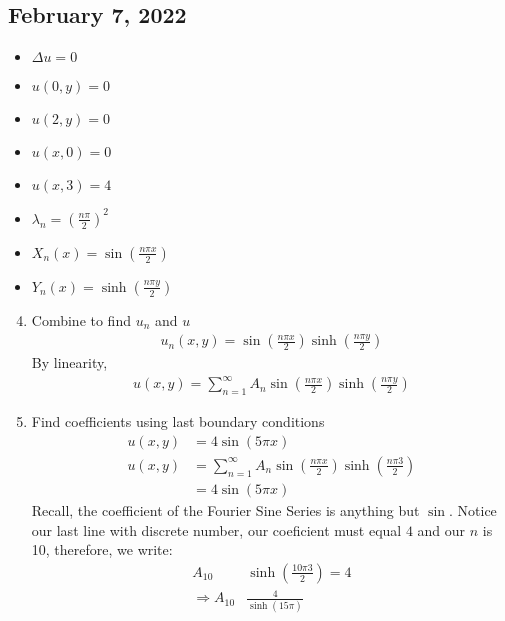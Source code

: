 \subsection*{February 7, 2022}
\begin{itemize}
  \item $\Delta u = 0$
  \item $u(0, y) = 0$
  \item $u(2, y) = 0$
  \item $u(x, 0) = 0$
  \item $u(x, 3) = 4$
  \item $\lambda_n = \left(\frac{n \pi}{2}\right)^2$
  \item $X_n(x) = \sin\left(\frac{n \pi x}{2}\right)$
  \item $Y_n(x) = \sinh\left(\frac{n \pi y}{2}\right)$
\end{itemize}
\begin{enumerate}
  \setcounter{enumi}{3}
  \item Combine to find $u_n$ and $u$
  \begin{align}
    u_n(x, y) = \sin\left( \frac{n \pi x}{2} \right)\sinh\left(\frac{n\pi y}{2} \right)
  \end{align}
  By linearity,
  \begin{align}
    u(x, y) = \sum^\infty_{n = 1} A_n \sin\left( \frac{n \pi x}{2} \right) \sinh\left( \frac{n \pi y}{2} \right)
  \end{align}
  \item Find coefficients using last boundary conditions
  \begin{align}
    u(x, y) & = 4 \sin(5 \pi x)\\
    u(x, y) & = \sum^\infty_{n = 1} A_n \sin\left(\frac{n \pi x}{2} \right) \sinh\left(\frac{n \pi 3}{2} \right)\\
    & = 4\sin(5 \pi x)
  \end{align}
  Recall, the coefficient of the Fourier Sine Series is anything but $\sin$. Notice our last line with discrete number, our coeficient must equal $4$ and our $n$ is 10, therefore, we write:
  \begin{align}
    A_{10} & \sinh\left( \frac{10 \pi 3}{2} \right) = 4\\
    \Rightarrow A_10 & \frac{4}{\sinh(15 \pi)}
  \end{align}
\end{enumerate}

